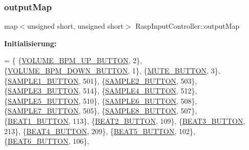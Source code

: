 \mbox{\label{class_rasp_input_controller_a7b59eba5cc562eccc91347ddbd777e50}} 
\subsubsection{\texorpdfstring{output\+Map}{outputMap}}
{\footnotesize\ttfamily map$<$unsigned short, unsigned short$>$ Rasp\+Input\+Controller\+::output\+Map\hspace{0.3cm}{\ttfamily [private]}}

{\bfseries Initialisierung\+:}
\begin{DoxyCode}
= \{
            \{\hyperlink{namespaceinputs_ab1d58fe937ccabff6ec4011a74028bfb}{VOLUME\_BPM\_UP\_BUTTON},   2\},
            \{\hyperlink{namespaceinputs_af3cad6ab00b2670e1710698945d28c17}{VOLUME\_BPM\_DOWN\_BUTTON}, 1\},
            \{\hyperlink{namespaceinputs_af0075a72395787966efcec2403306b43}{MUTE\_BUTTON},            3\},
            \{\hyperlink{namespaceinputs_a39dbaf6935309e198c1a0bc6e3468c45}{SAMPLE1\_BUTTON},         501\},
            \{\hyperlink{namespaceinputs_afcf2086c7f58f801e5654d8e573d928c}{SAMPLE2\_BUTTON},         503\},
            \{\hyperlink{namespaceinputs_a17158d35ca30fb91c6f9f757ce0d7ccc}{SAMPLE3\_BUTTON},         514\},
            \{\hyperlink{namespaceinputs_ac9ccac580f0955e454a367ddc6421d78}{SAMPLE4\_BUTTON},         512\},
            \{\hyperlink{namespaceinputs_ad22ade847b4a38fd418dccda07814551}{SAMPLE5\_BUTTON},         510\},
            \{\hyperlink{namespaceinputs_a88edcfa8b89df1abcca33bcec05974c4}{SAMPLE6\_BUTTON},         508\},
            \{\hyperlink{namespaceinputs_a50972dcf524a7b7c420ca75b0ba72a29}{SAMPLE7\_BUTTON},         505\},
            \{\hyperlink{namespaceinputs_a85f389284c616cd584390d04ad192ced}{SAMPLE8\_BUTTON},         507\},
            \{\hyperlink{namespaceinputs_af62021422f469c370f42c78a72504a66}{BEAT1\_BUTTON},           113\},
            \{\hyperlink{namespaceinputs_a8cdd33c9e53b617a2cf8bd32a5b74484}{BEAT2\_BUTTON},           109\},
            \{\hyperlink{namespaceinputs_ab60a6fc2188a034f76d3fbe554efe314}{BEAT3\_BUTTON},           213\},
            \{\hyperlink{namespaceinputs_af65f26f63a9572003a2bc49e7955e319}{BEAT4\_BUTTON},           209\},
            \{\hyperlink{namespaceinputs_a8a027829529daa53a24ece7b8334164b}{BEAT5\_BUTTON},           102\},
            \{\hyperlink{namespaceinputs_a6afdc23bce21454342081cf937e47ab9}{BEAT6\_BUTTON},           106\},

\end{DoxyCode}
